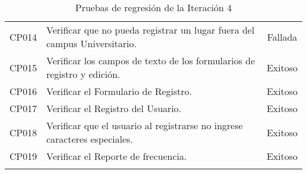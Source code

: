 \begin{longtable}{ c  X  c }
CP014
&
Verificar que no pueda registrar un lugar fuera del campus Universitario.
&
Fallada \\

CP015
&
Verificar los campos de texto de los formularios de registro y edición.
&
Exitoso \\

CP016
&
Verificar el Formulario de Registro.
&
Exitoso \\

CP017
&
Verificar el Registro del Usuario.
&
Exitoso \\

CP018
&
Verificar que el usuario al registrarse no ingrese caracteres especiales.
&
Exitoso \\

CP019
&
Verificar el Reporte de frecuencia.
&
Exitoso \\

      \bottomrule
      \caption{Pruebas de regresión de la Iteración 4}
      \label{tab:regresion_4}
    \end{longtable}
